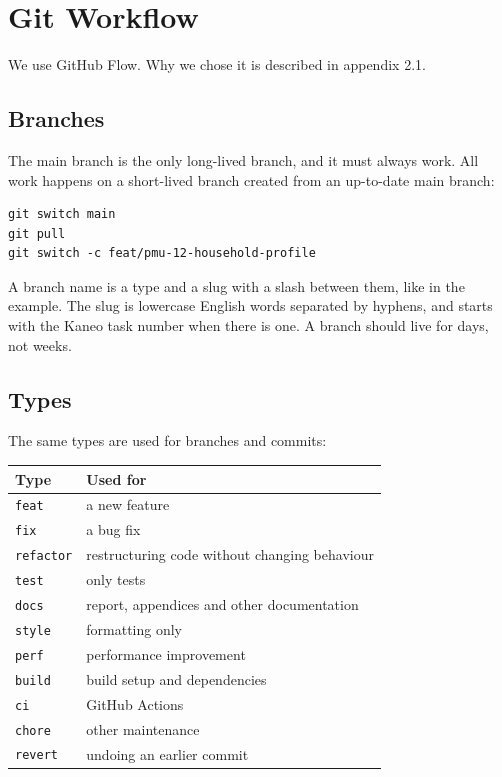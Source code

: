\documentclass[a4paper,11pt]{article}
\begin{document}
\section{Git Workflow}
We use GitHub Flow. Why we chose it is described in appendix 2.1.

\subsection{Branches}
The main branch is the only long-lived branch, and it must always work. All work happens on a short-lived branch created from an up-to-date main branch:
\begin{lstlisting}
git switch main
git pull
git switch -c feat/pmu-12-household-profile
\end{lstlisting}

A branch name is a type and a slug with a slash between them, like in the example. The slug is lowercase English words separated by hyphens, and starts with the Kaneo task number when there is one. A branch should live for days, not weeks.

\subsection{Types}
The same types are used for branches and commits:

\begin{center}
\begin{tabular}{@{}l l@{}}
\textbf{Type} & \textbf{Used for} \\
\hline
\texttt{feat} & a new feature \\
\texttt{fix} & a bug fix \\
\texttt{refactor} & restructuring code without changing behaviour \\
\texttt{test} & only tests \\
\texttt{docs} & report, appendices and other documentation \\
\texttt{style} & formatting only \\
\texttt{perf} & performance improvement \\
\texttt{build} & build setup and dependencies \\
\texttt{ci} & GitHub Actions \\
\texttt{chore} & other maintenance \\
\texttt{revert} & undoing an earlier commit \\
\end{tabular}
\end{center}
\end{document}
